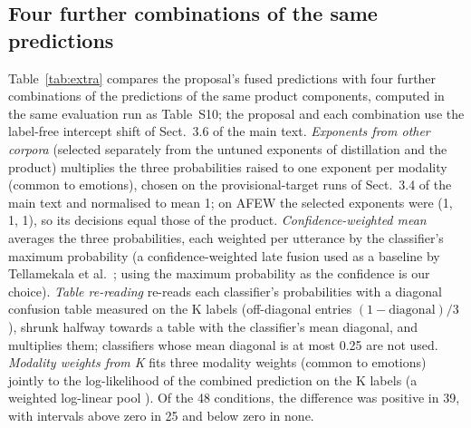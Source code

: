 \documentclass[sn-nature,pdflatex]{sn-jnl}
\begin{document}
\subsection{Four further combinations of the same predictions}
Table~\ref{tab:extra} compares the proposal's fused predictions with four further combinations of the predictions of the same product components, computed in the same evaluation run as Table~S10; the proposal and each combination use the label-free intercept shift of Sect.~3.6 of the main text. \emph{Exponents from other corpora} (selected separately from the untuned exponents of distillation and the product) multiplies the three probabilities raised to one exponent per modality (common to emotions), chosen on the provisional-target runs of Sect.~3.4 of the main text and normalised to mean 1; on AFEW the selected exponents were (1, 1, 1), so its decisions equal those of the product. \emph{Confidence-weighted mean} averages the three probabilities, each weighted per utterance by the classifier's maximum probability (a confidence-weighted late fusion used as a baseline by Tellamekala et al.\ \cite{tellamekala2024}; using the maximum probability as the confidence is our choice). \emph{Table re-reading} re-reads each classifier's probabilities with a diagonal confusion table measured on the K labels (off-diagonal entries $(1-\text{diagonal})/3$), shrunk halfway towards a table with the classifier's mean diagonal, and multiplies them; classifiers whose mean diagonal is at most 0.25 are not used. \emph{Modality weights from K} fits three modality weights (common to emotions) jointly to the log-likelihood of the combined prediction on the K labels (a weighted log-linear pool \cite{heskes1997}). Of the 48 conditions, the difference was positive in 39, with intervals above zero in 25 and below zero in none.
\end{document}
